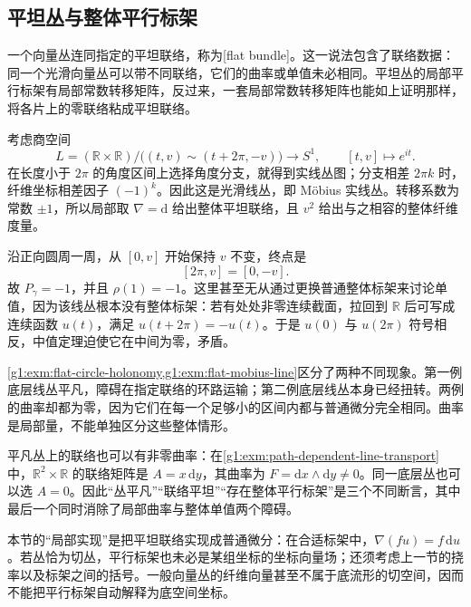 \subsection{平坦丛与整体平行标架}
\label{g1:subsec:1505:04}

一个向量丛连同指定的平坦联络，称为[flat bundle]。这一说法包含了联络数据：同一个光滑向量丛可以带不同联络，它们的曲率或单值未必相同。平坦丛的局部平行标架有局部常数转移矩阵，反过来，一套局部常数转移矩阵也能如上证明那样，将各片上的零联络粘成平坦联络。

\begin{example}
	\label{g1:exm:flat-mobius-line}
	考虑商空间
	\[
		L=(\mathbb R\times\mathbb R)/\bigl((t,v)\sim(t+2\pi,-v)\bigr)
		\longrightarrow S^1,\qquad
		[t,v]\longmapsto e^{it}.
	\]
	在长度小于 \(2\pi\) 的角度区间上选择角度分支，就得到实线丛图；分支相差 \(2\pi k\) 时，纤维坐标相差因子 \((-1)^k\)。因此这是光滑线丛，即 Möbius 实线丛。转移系数为常数 \(\pm1\)，所以局部取 \(\nabla=\mathrm{d}\) 给出整体平坦联络，且 \(v^2\) 给出与之相容的整体纤维度量。

	沿正向圆周一周，从 \([0,v]\) 开始保持 \(v\) 不变，终点是
	\[
		[2\pi,v]=[0,-v].
	\]
	故 \(P_\gamma=-1\)，并且 \(\rho(1)=-1\)。这里甚至无从通过更换普通整体标架来讨论单值，因为该线丛根本没有整体标架：若有处处非零连续截面，拉回到 \(\mathbb R\) 后可写成连续函数 \(u(t)\)，满足 \(u(t+2\pi)=-u(t)\)。于是 \(u(0)\) 与 \(u(2\pi)\) 符号相反，中值定理迫使它在中间为零，矛盾。
\end{example}

\cref{g1:exm:flat-circle-holonomy,g1:exm:flat-mobius-line}区分了两种不同现象。第一例底层线丛平凡，障碍在指定联络的环路运输；第二例底层线丛本身已经扭转。两例的曲率却都为零，因为它们在每一个足够小的区间内都与普通微分完全相同。曲率是局部量，不能单独区分这些整体情形。

\ProseParagraphBreak

平凡丛上的联络也可以有非零曲率：在\cref{g1:exm:path-dependent-line-transport}中，\(\mathbb R^2\times\mathbb R\) 的联络矩阵是 \(A=x\,\mathrm{d}y\)，其曲率为 \(F=\mathrm{d}x\wedge\mathrm{d}y\ne0\)。同一底层丛也可以选 \(A=0\)。因此“丛平凡”“联络平坦”“存在整体平行标架”是三个不同断言，其中最后一个同时消除了局部曲率与整体单值两个障碍。

\ProseParagraphBreak

本节的“局部实现”是把平坦联络实现成普通微分：在合适标架中，\(\nabla(fu)=f\,\mathrm{d}u\)。若丛恰为切丛，平行标架也未必是某组坐标的坐标向量场；还须考虑上一节的挠率以及标架之间的括号。一般向量丛的纤维向量甚至不属于底流形的切空间，因而不能把平行标架自动解释为底空间坐标。

